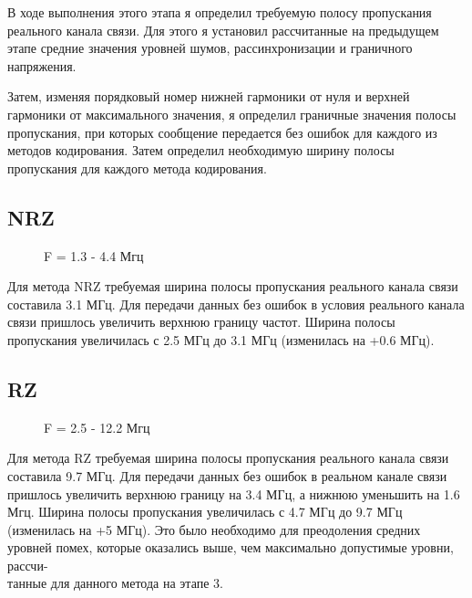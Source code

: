 В ходе выполнения этого этапа я определил требуемую полосу пропускания реального канала связи. Для этого я установил рассчитанные на предыдущем этапе средние значения уровней шумов, рассинхронизации и граничного напряжения.

Затем, изменяя порядковый номер нижней гармоники от нуля и верхней гармоники от максимального значения, я определил граничные значения полосы пропускания, при которых сообщение передается без ошибок для каждого из методов кодирования. Затем определил необходимую ширину полосы пропускания для каждого метода кодирования.

\subsection{NRZ}

\begin{wrapfigure}{l}{0.63\textwidth}
	\centering
	\caption{F =  1.3 - 4.4 Мгц}
    \vspace{-2.1cm}
\end{wrapfigure}

Для метода NRZ требуемая ширина полосы пропускания реального канала связи составила 3.1 МГц.
Для передачи данных без ошибок в условия реального канала связи пришлось увеличить верхнюю границу частот. Ширина полосы пропускания увеличилась с 2.5 МГц до 3.1 МГц (изменилась на +0.6 МГц).

\subsection{RZ}

\begin{wrapfigure}{r}{0.5\textwidth}
	\centering
	\caption{F =  2.5 - 12.2 Мгц}
    \vspace{-1.7cm}
\end{wrapfigure}

\vspace{0.5cm}
Для метода RZ требуемая ширина полосы пропускания реального канала связи составила 9.7 МГц.
Для передачи данных без ошибок в реальном канале связи пришлось увеличить верхнюю границу на 3.4 МГц, а нижнюю уменьшить на 1.6 Мгц. Ширина полосы пропускания увеличилась с 4.7 МГц до 9.7 МГц (изменилась на +5 МГц). Это было необходимо для преодоления средних уровней помех, которые оказались выше, чем максимально допустимые уровни, рассчи-\\танные для данного метода на этапе 3.

